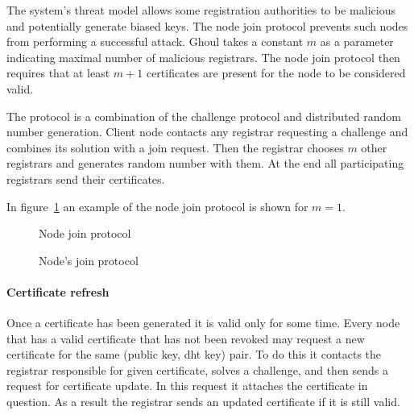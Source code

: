 The system's threat model allows some registration authorities to be malicious
and potentially generate biased keys. The node join protocol prevents such nodes
from performing a successful attack. Ghoul takes a constant $m$ as a parameter 
indicating maximal number of malicious registrars. The node join protocol then
requires that at least $m+1$ certificates are present for the node to be
considered valid.

The protocol is a combination of the challenge protocol and distributed random
number generation. Client node contacts any registrar requesting a challenge and
combines its solution with a join request. Then the registrar chooses $m$ other
registrars and generates random number with them. At the end all participating
registrars send their certificates.

In figure~\ref{fig:node_join_prot} an example of the node join protocol is shown
for $m=1$.

\begin{figure}
\begin{msc}{Node join protocol}
\setlength{\instdist}{5.5cm}
\setlength{\envinstdist}{3cm}
\setlength{\instwidth}{2.5cm}
\nextlevel
{}
\nextlevel[5]
\nextlevel
{}
\nextlevel[1]


\nextlevel[6]


\nextlevel


\nextlevel[2]
\nextlevel[1]
\end{msc}
\caption{Node's join protocol}
\label{fig:node_join_prot}
\end{figure}

\paragraph{Certificate refresh} Once a certificate has been generated it is
valid only for some time. Every node that has a valid certificate that has not
been revoked may request a new certificate for the same (public key, dht key)
pair. To do this it contacts the registrar responsible for given certificate,
solves a challenge, and then sends a request for certificate update. In this
request it attaches the certificate in question. As a result the registrar sends
an updated certificate if it is still valid.

